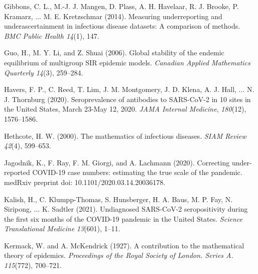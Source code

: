 \documentclass[12pt]{article}
\begin{document}
\begin{singlespace}
\begin{footnotesize}
\begin{list}{}{\setlength{\topsep}{8pt}\setlength{\leftmargin}{0.1in}%
\setlength{\listparindent}{-0.1in}\setlength{\itemindent}{-0.1in}%
\setlength{\parsep}{0.6em}}
\item
Gibbons, C. L., M.-J. J. Mangen, D. Plass, A. H. Havelaar, R. J. Brooke, P.
Kramarz, ... M. E. Kretzschmar (2014). Measuring underreporting and
underascertainment in infectious disease datasets: A comparison of methods.
\textit{BMC Public Health 14}(1), 147.%

\item
Guo, H., M. Y. Li, and Z. Shuai (2006). Global stability of the endemic
equilibrium of multigroup SIR epidemic models. \textit{Canadian Applied
Mathematics Quarterly 14}(3), 259--284.%

\item
Havers, F. P., C. Reed, T. Lim, J. M. Montgomery, J. D. Klena, A. J. Hall, ...
N. J. Thornburg (2020). Seroprevalence of antibodies to SARS-CoV-2 in 10 sites
in the United States, March 23-May 12, 2020. \textit{JAMA Internal Medicine},
\textit{180}(12), 1576--1586.%

\item
Hethcote, H. W. (2000). The mathematics of infectious diseases. \textit{SIAM
Review 42}(4), 599--653.%

\item
Jagodnik, K., F. Ray, F. M. Giorgi, and A. Lachmann (2020). Correcting
under-reported COVID-19 case numbers: estimating the true scale of the
pandemic. medRxiv preprint doi: 10.1101/2020.03.14.20036178.%

\item
Kalish, H., C. Klumpp-Thomas, S. Hunsberger, H. A. Baus, M. P. Fay, N.
Siripong, ... K. Sadtler (2021). Undiagnosed SARS-CoV-2 seropositivity during
the first six months of the COVID-19 pandemic in the United States.
\textit{Science Translational Medicine} \textit{13}(601), 1--11.%

\item
Kermack, W. and A. McKendrick (1927). A contribution to the mathematical
theory of epidemics. \textit{Proceedings of the Royal Society of London.
Series A. 115}(772), 700--721.%


\end{list}
\end{footnotesize}
\end{singlespace}
\end{document}
